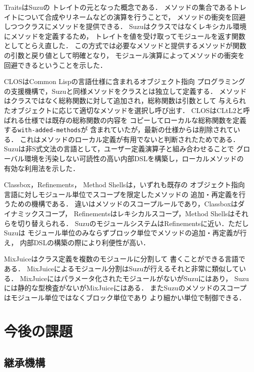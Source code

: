 \documentclass[a4paper,11pt,dvipdfmx]{jreport}
\begin{document}
Traits\cite{Traits,ApplyingTraits,FineGrainedReuse}はSuzuの
トレイトの元となった概念である．
メソッドの集合であるトレイトについて合成やリネームなどの演算を行うことで，
メソッドの衝突を回避しつつクラスにメソッドを提供できる．
Suzuはクラスではなくレキシカル環境にメソッドを定義するため，
トレイトを値を受け取ってモジュールを返す関数としてとらえ直した．
この方式では必要なメソッドと提供するメソッドが関数の引数と戻り値として明確となり，
モジュール演算によってメソッドの衝突を回避できるということを示した．

CLOS\cite{CLOS}はCommon Lispの言語仕様に含まれるオブジェクト指向
プログラミングの支援機構で，Suzuと同様メソッドをクラスとは独立して定義する．
メソッドはクラスではなく総称関数に対して追加され，総称関数は引数として
与えられたオブジェクトに応じて適切なメソッドを選択し呼び出す．
CLOSはCLtL2\cite{CLtL2}と呼ばれる仕様では既存の総称関数の内容を
コピーしてローカルな総称関数を定義する\verb|with-added-methods|が
含まれていたが，最新の仕様からは削除されている．
これはメソッドのローカル定義が有用でないと判断されたためである．
Suzuは非S式文法の言語として，ユーザー定義演算子と組み合わせることで
グローバル環境を汚染しない可読性の高い内部DSLを構築し，ローカルメソッドの
有効な利用法を示した．

Classbox\cite{Classboxes}，Refinements\cite{Refinements}，
Method Shells\cite{MethodShells}は，いずれも既存の
オブジェクト指向言語に対しモジュール単位でスコープを限定したメソッドの
追加・再定義を行うための機構である．
違いはメソッドのスコープルールであり，Classboxはダイナミックスコープ，
Refinementsはレキシカルスコープ，Method Shellsはそれらを切り替えられる．
SuzuのモジュールシステムはRefinementsに近い．ただしSuzuは
モジュール単位のみならずブロック単位でメソッドの追加・再定義が行え，
内部DSLの構築の際により利便性が高い．

MixJuice\cite{MixJuice}はクラス定義を複数のモジュールに分割して
書くことができる言語である．
MixJuiceによるモジュール分割はSuzuが行えるそれと非常に類似している．
MixJuiceにはパラメータ化されたモジュールがないがSuzuにはあり，
Suzuには静的な型検査がないがMixJuiceにはある．
またSuzuのメソッドのスコープはモジュール単位ではなくブロック単位であり
より細かい単位で制御できる．

\chapter{今後の課題}
\label{chapter:future-work}

\section{継承機構}
\end{document}
